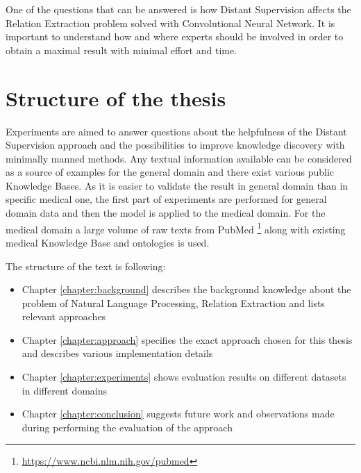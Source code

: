 One of the questions that can be answered is how Distant Supervision affects the Relation Extraction problem
 solved with Convolutional Neural Network. It is important to understand how and where experts 
should be involved in order to obtain a maximal result with minimal effort and time. 

\section{Structure of the thesis}
Experiments are aimed to answer questions about the helpfulness of the Distant Supervision approach 
and the possibilities to improve knowledge discovery with minimally manned methods. Any textual 
information available can be considered as a source of examples for the general domain and there 
exist various public Knowledge Bases. As it is easier to validate the result in general domain than in 
specific medical one, the first part of experiments are performed for general domain data and then 
the model is applied to the medical domain. For the medical domain a large volume of raw texts from PubMed \footnote{\url{https://www.ncbi.nlm.nih.gov/pubmed}} 
along with existing medical Knowledge Base and ontologies is used.

The structure of the text is following:
\begin{itemize}
  \item Chapter \ref{chapter:background} describes the background knowledge about the 
  problem of Natural Language Processing, Relation Extraction and lists relevant approaches
  \item Chapter \ref{chapter:approach} specifies the exact approach chosen for this thesis 
  and describes various implementation details
  \item Chapter \ref{chapter:experiments} shows evaluation results on different datasets in 
  different domains
  \item Chapter \ref{chapter:conclusion} suggests future work and observations made during 
  performing the evaluation of the approach
\end{itemize}
